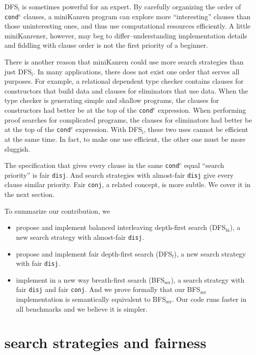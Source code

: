 \documentclass[format=acmlarge, review=true, authordraft=true]{acmart}
\newcommand{\conde}{\texttt{cond$^e$}}
\newcommand{\conj}{\texttt{conj}}
\newcommand{\disj}{\texttt{disj}}
\newcommand{\DFSi }[0]{DFS$_\textrm{i}$}
\newcommand{\DFSf }[0]{DFS$_\textrm{f}$}
\newcommand{\DFSbi}[0]{DFS$_\textrm{bi}$}
\newcommand{\BFSser}[0]{BFS$_\textrm{ser}$}
\begin{document}
\DFSi{} is sometimes powerful for an expert. By carefully organizing the order 
of \conde{} clauses, a miniKanren program can explore more ``interesting'' 
clauses than those uninteresting ones, and thus use computational resources 
efficiently. A little miniKanrener, however, may beg to differ--understanding
implementation details and fiddling with clause order is not the first
priority of a beginner.

There is another reason that miniKanren could use more search strategies than
just \DFSi. In many applications, there does not exist one order that serves all
purposes. For example, a relational dependent type checker contains
clauses for constructors that build data and clauses for eliminators that use
data. When the type checker is generating simple and shallow programs,
the clauses for constructors had better be at the top of the
\conde{} expression.
When performing proof searches for complicated programs, the clauses for 
eliminators had better be at the top of the \conde{} expression. With \DFSi, 
these two uses cannot be efficient at the same time. In fact, to make one use 
efficient, the other one must be more sluggish.

The specification that gives every clause in the same \conde{} equal 
``search priority'' is fair \disj{}. And search strategies with 
almost-fair \disj{} give every clause similar priority. 
Fair \conj{}, a related concept, is more subtle. We cover it in the next 
section.

To summarize our contribution, we
\begin{itemize}
	\item propose and implement balanced interleaving depth-first search 
	(\DFSbi{}), a new search strategy with almost-fair \disj{}.
	\item propose and implement fair depth-first search (\DFSf{}), a 
	new search strategy with fair \disj{}.
	\item implement in a new way breath-first search (\BFSser), a search 
strategy with fair \disj{} and fair \conj{}. And we prove formally that our 
\BFSser{} implementation is semantically equivalent to \BFSser{}.
Our code runs faster in all benchmarks and we believe it is simpler.
\end{itemize}

\section{search strategies and fairness}
\end{document}
